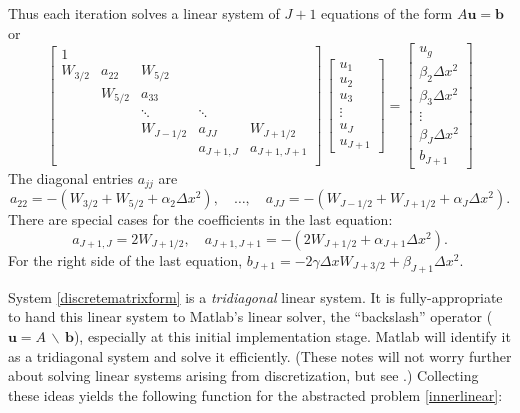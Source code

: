 \documentclass[letterpaper,final,12pt,reqno]{amsart}
\begin{document}
Thus each iteration solves a linear system of $J+1$ equations of the form $A \mathbf{u} = \mathbf{b}$ or
\begin{equation}
\begin{bmatrix}
1 &  &  &  &  \\
W_{3/2} & a_{22} & W_{5/2} &  &  \\
 & W_{5/2} & a_{33} &  &  \\
 &  & \ddots & \ddots &  \\
 &  & W_{J-1/2} & a_{JJ} & W_{J+1/2} \\
 &  &  & a_{J+1,J} & a_{J+1,J+1} \\
\end{bmatrix}\,
\begin{bmatrix}
u_1 \\ u_2 \\ u_3 \\ \vdots \\ u_J \\ u_{J+1}
\end{bmatrix}
=
\begin{bmatrix}
u_g \\ \beta_2 \Delta x^2 \\ \beta_3 \Delta x^2 \\ \vdots \\ \beta_J \Delta x^2 \\ b_{J+1}
\end{bmatrix}  \label{discretematrixform}
\end{equation}
The diagonal entries $a_{jj}$ are
  $$a_{22} = -(W_{3/2}+W_{5/2}+\alpha_2 \Delta x^2), \quad \dots, \quad a_{JJ} = -(W_{J-1/2}+W_{J+1/2}+\alpha_J \Delta x^2).$$
There are special cases for the coefficients in the last equation:
  $$a_{J+1,J} = 2 W_{J+1/2}, \quad a_{J+1,J+1} = -(2 W_{J+1/2}+\alpha_{J+1}\Delta x^2).$$
For the right side of the last equation, $b_{J+1} = -2 \gamma \Delta x W_{J+3/2} + \beta_{J+1} \Delta x^2$.

System \eqref{discretematrixform} is a \emph{tridiagonal} linear system.  It is fully-appropriate to hand this linear system to Matlab's linear solver, the ``backslash'' operator ($\mathbf{u} = A\, \backslash\, \mathbf{b}$), especially at this initial implementation stage. Matlab will identify it as a tridiagonal system and solve it efficiently.  (These notes will not worry further about solving linear systems arising from discretization, but see \cite{Bueler2021}.)  Collecting these ideas yields the following function for the abstracted problem \eqref{innerlinear}:
\end{document}
